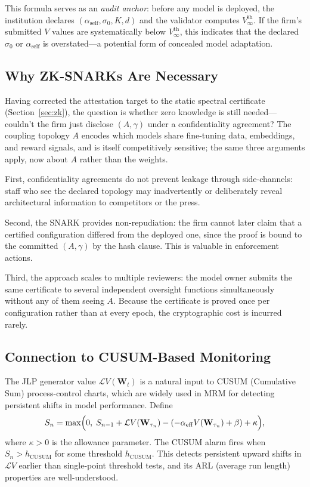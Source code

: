 \documentclass[12pt]{article}
\theoremstyle{plain}
\theoremstyle{definition}
\newcommand{\Lgen}{\mathcal{L}}
\newcommand{\W}{\mathbf{W}}
\begin{document}
This formula serves as an \emph{audit anchor}: before any model is
deployed, the institution declares $(\alpha_{\mathrm{self}}, \sigma_0, K, d)$
and the validator computes $V_\infty^{\mathrm{th}}$.  If the firm's
submitted $V$ values are systematically below $V_\infty^{\mathrm{th}}$,
this indicates that the declared $\sigma_0$ or $\alpha_{\mathrm{self}}$
is overstated---a potential form of concealed model adaptation.

\subsection{Why ZK-SNARKs Are Necessary}

Having corrected the attestation target to the static spectral certificate
(Section~\ref{sec:zk}), the question is whether zero knowledge is still
needed---couldn't the firm just disclose $(A,\gamma)$ under a
confidentiality agreement?  The coupling topology $A$ encodes which models
share fine-tuning data, embeddings, and reward signals, and is itself
competitively sensitive; the same three arguments apply, now about $A$
rather than the weights.

First, confidentiality agreements do not prevent leakage through
side-channels: staff who see the declared topology may inadvertently or
deliberately reveal architectural information to competitors or the press.

Second, the SNARK provides non-repudiation: the firm cannot later claim that
a certified configuration differed from the deployed one, since the proof is
bound to the committed $(A,\gamma)$ by the hash clause.  This is valuable in
enforcement actions.

Third, the approach scales to multiple reviewers: the model owner submits the
same certificate to several independent oversight functions simultaneously
without any of them seeing $A$.  Because the certificate is proved once per configuration rather
than at every epoch, the cryptographic cost is incurred rarely.

\subsection{Connection to CUSUM-Based Monitoring}

The JLP generator value $\Lgen V(\W_t)$ is a natural input to CUSUM
(Cumulative Sum) process-control charts, which are widely used in MRM
for detecting persistent shifts in model performance.  Define
\[
  S_n = \max\Bigl(0,\; S_{n-1} + \Lgen V(\W_{\tau_n})
  - (-\alpha_{\mathrm{eff}} V(\W_{\tau_n}) + \beta) + \kappa\Bigr),
\]
where $\kappa > 0$ is the allowance parameter.  The CUSUM alarm fires
when $S_n > h_{\mathrm{CUSUM}}$ for some threshold $h_{\mathrm{CUSUM}}$.
This detects persistent upward shifts in $\Lgen V$ earlier than
single-point threshold tests, and its ARL (average run length) properties
are well-understood.
\end{document}
